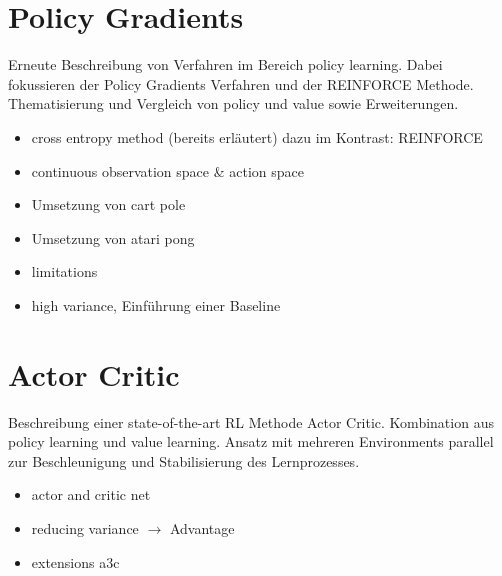 \documentclass[11pt]{scrartcl}
\begin{document}
\section{Policy Gradients}
Erneute Beschreibung von Verfahren im Bereich policy learning. Dabei fokussieren der Policy Gradients Verfahren und der REINFORCE Methode. Thematisierung und Vergleich von policy und value sowie Erweiterungen.
\begin{itemize}
\itemsep0pt
\item cross entropy method (bereits erläutert) dazu im Kontrast: REINFORCE
\item continuous observation space \& action space
\item Umsetzung von cart pole
\item Umsetzung von atari pong
\item limitations
\item high variance, Einführung einer Baseline
\end{itemize}

\section{Actor Critic}
Beschreibung einer state-of-the-art RL Methode Actor Critic. Kombination aus policy learning und value learning. Ansatz mit mehreren Environments parallel zur Beschleunigung und Stabilisierung des Lernprozesses.
\begin{itemize}
\itemsep0pt
\item actor and critic net
\item reducing variance $\rightarrow$ Advantage
\item extensions a3c
\end{itemize}
\end{document}
